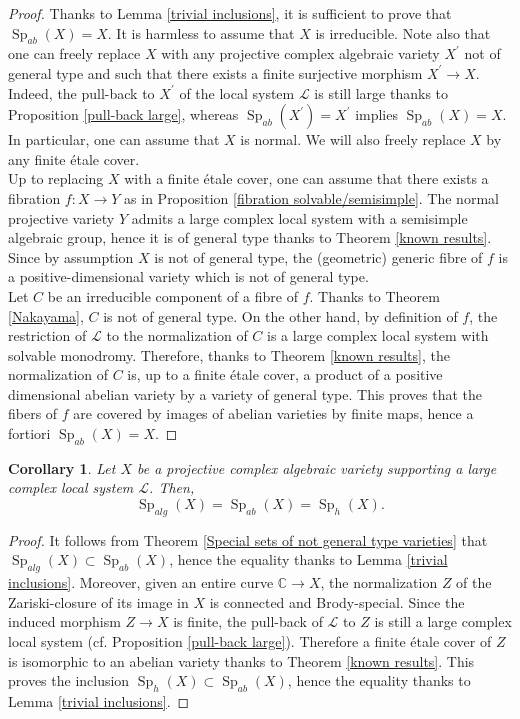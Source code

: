 \documentclass[11pt,letterpaper]{amsart}
\def\bC{\mathbb{C}}
\def\cL{\mathcal{L}}
\theoremstyle{plain}
\newtheorem{cor}[thm]{Corollary}
\DeclareMathOperator{\Sp}{Sp}
\begin{document}
\begin{proof}
Thanks to Lemma \ref{trivial inclusions}, it is sufficient to prove that $\Sp_{ab}(X) = X$. It is harmless to assume that $X$ is irreducible. Note also that one can freely replace $X$ with any projective complex algebraic variety $X^\prime$ not of general type and such that there exists a finite surjective morphism $X^\prime \to X$. Indeed, the pull-back to $X^\prime$ of the local system $\cL$ is still large thanks to Proposition \ref{pull-back large}, whereas $\Sp_{ab}(X^\prime) = X^\prime$ implies $\Sp_{ab}(X) = X$. In particular, one can assume that $X$ is normal. We will also freely replace $X$ by any finite étale cover.\\
Up to replacing $X$ with a finite étale cover, one can assume that there exists a fibration $f \colon X \to Y$ as in Proposition \ref{fibration solvable/semisimple}. The normal projective variety $Y$ admits a large complex local system with a semisimple algebraic group, hence it is of general type thanks to Theorem \ref{known results}. Since by assumption $X$ is not of general type, the (geometric) generic fibre of $f$ is a positive-dimensional variety which is not of general type.\\
Let $C$ be an irreducible component of a fibre of $f$. Thanks to Theorem \ref{Nakayama}, $C$ is not of general type. On the other hand, by definition of $f$, the restriction of $\cL$ to the normalization of $C$ is a large complex local system with solvable monodromy. Therefore, thanks to Theorem \ref{known results}, the normalization of $C$ is, up to a finite étale cover, a product of a positive dimensional abelian variety by a variety of general type. This proves that the fibers of $f$ are covered by images of abelian varieties by finite maps, hence a fortiori $\Sp_{ab}(X) = X$.
\end{proof}



\begin{cor}\label{Equality of special subsets}
Let $X$ be a projective complex algebraic variety supporting a large complex local system $\cL$. Then,
\[  \Sp_{alg}(X) = \Sp_{ab}(X) = \Sp_h(X) .\]
\end{cor}

\begin{proof}
It follows from Theorem \ref{Special sets of not general type varieties} that $\Sp_{alg}(X) \subset  \Sp_{ab}(X)$, hence the equality thanks to Lemma \ref{trivial inclusions}. Moreover, given an entire curve $\bC \to X$, the normalization $Z$ of the Zariski-closure of its image in $X$ is connected and Brody-special. Since the induced morphism $Z \to X$ is finite, the pull-back of $\cL$ to $Z$ is still a large complex local system (cf. Proposition \ref{pull-back large}). Therefore a finite étale cover of $Z$ is isomorphic to an abelian variety thanks to Theorem \ref{known results}. This proves the inclusion $\Sp_{h}(X) \subset \Sp_{ab}(X)$, hence the equality thanks to Lemma \ref{trivial inclusions}. 
\end{proof}
\end{document}

